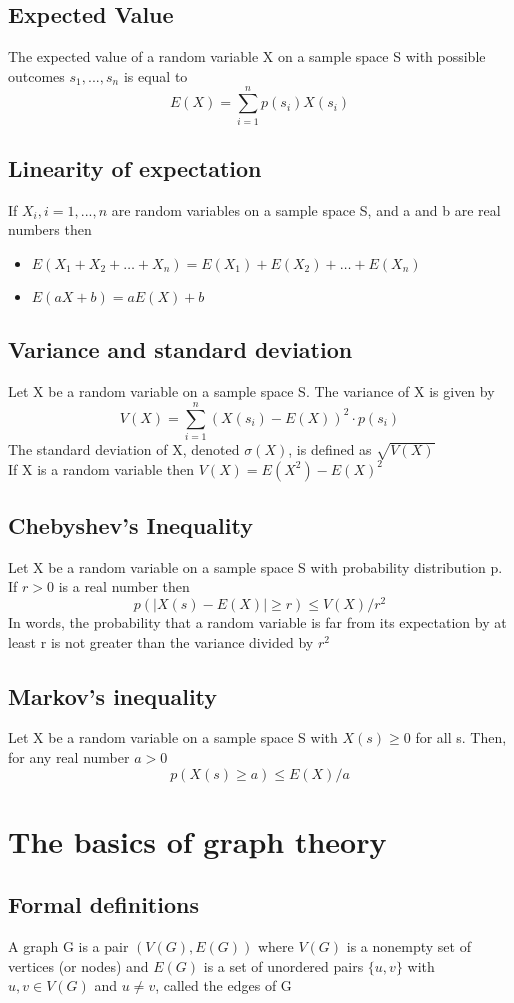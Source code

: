 \documentclass{article}[18pt]
\begin{document}
\subsection{Expected Value}
The expected value of a random variable X on a sample space S with possible outcomes $s_1,...,s_n$ is equal to
$$
E(X)=\sum_{i=1}^{n} p\left(s_{i}\right) X\left(s_{i}\right)
$$
\subsection{Linearity of expectation}
If $X_i, i=1,...,n$ are random variables on a sample space S, and a and b are real numbers then
\begin{itemize}
	\item $E\left(X_{1}+X_{2}+\ldots+X_{n}\right)=E\left(X_{1}\right)+E\left(X_{2}\right)+\ldots+E\left(X_{n}\right)$
	\item $E(a X+b)=a E(X)+b$
\end{itemize}
\subsection{Variance and standard deviation}
Let X be a random variable on a sample space S. The variance of X is given by
$$
V(X)=\sum_{i=1}^{n}\left(X\left(s_{i}\right)-E(X)\right)^{2} \cdot p\left(s_{i}\right)
$$
The standard deviation of X, denoted $\sigma(X)$, is defined as $\sqrt{V(X)}$\\
If X is a random variable then $V(X)=E\left(X^{2}\right)-E(X)^{2}$
\subsection{Chebyshev's Inequality}
Let X be a random variable on a sample space S with probability distribution p. If $r>0$ is a real number then
\[
p(|X(s)-E(X)| \geq r) \leq V(X) / r^{2}
\]
In words, the probability that a random variable is far from its expectation by at least r is not greater than the variance divided by $r^2$
\subsection{Markov's inequality}
Let X be a random variable on a sample space S with $X(s)\geqslant 0$ for all s. Then, for any real number $a>0$
\[
p(X(s) \geq a) \leq E(X) / a
\]
\section{The basics of graph theory}
\subsection{Formal definitions}
A graph G is a pair $(V(G),E(G))$ where $V(G)$ is a nonempty set of vertices (or nodes) and $E(G)$ is a set of unordered pairs $\{u,v\}$ with $u,v\in V(G)$ and $u\neq v$, called the edges of G
\end{document}
